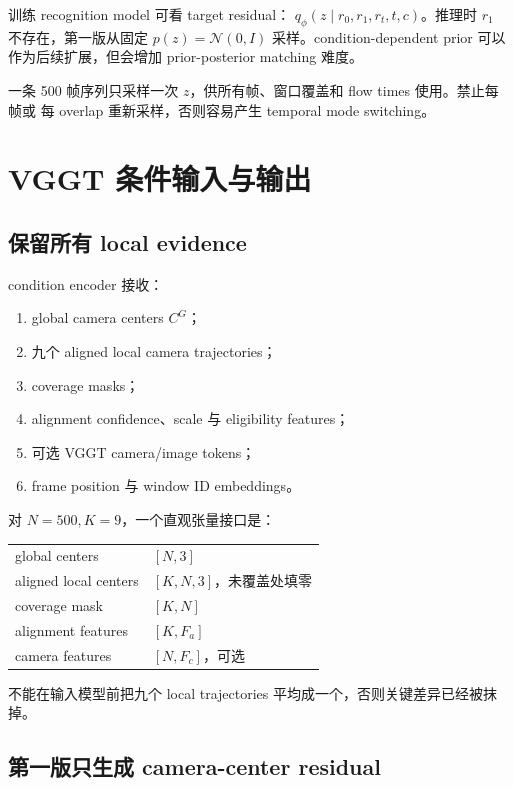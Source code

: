 \documentclass[UTF8,a4paper,11pt]{ctexart}
\begin{document}
训练 recognition model 可看 target residual：
$q_\phi(z\mid r_0,r_1,r_t,t,c)$。推理时 $r_1$ 不存在，第一版从固定
$p(z)=\mathcal N(0,I)$ 采样。condition-dependent prior 可以作为后续扩展，但会增加
prior-posterior matching 难度。

一条 500 帧序列只采样一次 $z$，供所有帧、窗口覆盖和 flow times 使用。禁止每帧或
每 overlap 重新采样，否则容易产生 temporal mode switching。

\section{VGGT 条件输入与输出}

\subsection{保留所有 local evidence}

condition encoder 接收：
\begin{enumerate}
  \item global camera centers $C^G$；
  \item 九个 aligned local camera trajectories；
  \item coverage masks；
  \item alignment confidence、scale 与 eligibility features；
  \item 可选 VGGT camera/image tokens；
  \item frame position 与 window ID embeddings。
\end{enumerate}

对 $N=500,K=9$，一个直观张量接口是：
\begin{center}
\begin{tabular}{ll}
\toprule
global centers & $[N,3]$ \\
aligned local centers & $[K,N,3]$，未覆盖处填零 \\
coverage mask & $[K,N]$ \\
alignment features & $[K,F_a]$ \\
camera features & $[N,F_c]$，可选 \\
\bottomrule
\end{tabular}
\end{center}

不能在输入模型前把九个 local trajectories 平均成一个，否则关键差异已经被抹掉。

\subsection{第一版只生成 camera-center residual}
\end{document}
